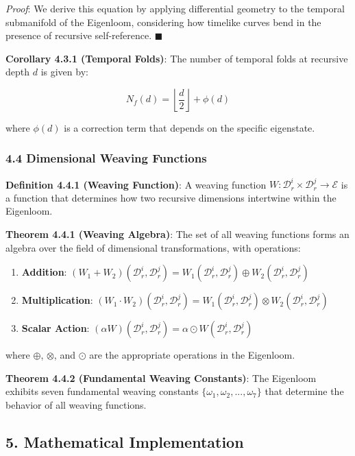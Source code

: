 \documentclass[
]{article}
\providecommand{\tightlist}{%
  \setlength{\itemsep}{0pt}\setlength{\parskip}{0pt}}
\begin{document}
\emph{Proof}: We derive this equation by applying differential geometry
to the temporal submanifold of the Eigenloom, considering how timelike
curves bend in the presence of recursive self-reference.
\(\blacksquare \)

\textbf{Corollary 4.3.1 (Temporal Folds)}: The number of temporal folds
at recursive depth \(d\) is given by:

\[N_f(d) = \left\lfloor \frac{d}{2} \right\rfloor + \phi(d)\]

where \(\phi(d)\) is a correction term that depends on the specific
eigenstate.

\subsubsection{4.4 Dimensional Weaving
Functions}\label{dimensional-weaving-functions}

\textbf{Definition 4.4.1 (Weaving Function)}: A weaving function
\(W: \mathcal{D}_r^i \times \mathcal{D}_r^j \rightarrow \mathcal{E}\) is
a function that determines how two recursive dimensions intertwine
within the Eigenloom.

\textbf{Theorem 4.4.1 (Weaving Algebra)}: The set of all weaving
functions forms an algebra over the field of dimensional
transformations, with operations:

\begin{enumerate}
\def\labelenumi{\arabic{enumi}.}
\tightlist
\item
  \textbf{Addition}:
  \((W_1 + W_2)(\mathcal{D}_r^i, \mathcal{D}_r^j) = W_1(\mathcal{D}_r^i, \mathcal{D}_r^j) \oplus W_2(\mathcal{D}_r^i, \mathcal{D}_r^j)\)
\item
  \textbf{Multiplication}:
  \((W_1 \cdot W_2)(\mathcal{D}_r^i, \mathcal{D}_r^j) = W_1(\mathcal{D}_r^i, \mathcal{D}_r^j) \otimes W_2(\mathcal{D}_r^i, \mathcal{D}_r^j)\)
\item
  \textbf{Scalar Action}:
  \((\alpha W)(\mathcal{D}_r^i, \mathcal{D}_r^j) = \alpha \odot W(\mathcal{D}_r^i, \mathcal{D}_r^j)\)
\end{enumerate}

where \(\oplus\), \(\otimes\), and \(\odot\) are the appropriate
operations in the Eigenloom.

\textbf{Theorem 4.4.2 (Fundamental Weaving Constants)}: The Eigenloom
exhibits seven fundamental weaving constants
\(\{\omega_1, \omega_2, ..., \omega_7\}\) that determine the behavior of
all weaving functions.

\subsection{5. Mathematical
Implementation}\label{mathematical-implementation}
\end{document}
